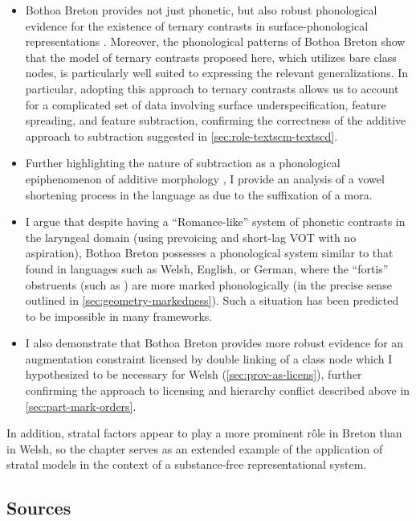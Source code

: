 \begin{itemize}
\item Bothoa Breton provides not just phonetic, but also robust phonological evidence for the existence of ternary contrasts in surface\hyp phonological representations \citep[\cfm][]{kim02:_phonol,strycharczuk12:_phonet}. Moreover, the phonological patterns of Bothoa Breton show that the model of ternary contrasts proposed here, which utilizes bare class nodes, is particularly well suited to expressing the relevant generalizations. In particular, adopting this approach to ternary contrasts allows us to account for a complicated set of data involving surface underspecification, feature spreading, and feature subtraction, confirming the correctness of the additive approach to subtraction suggested in \cref{sec:role-textscm-textscd}.
\item Further highlighting the nature of subtraction as a phonological epiphenomenon of additive morphology \citep{bye09:_exten_expon_and_non_concat_morph}, I provide an analysis of a vowel shortening process in the language as due to the suffixation of a mora.
\item I argue that despite having a \enquote{Romance\hyp like} system of phonetic contrasts in the laryngeal domain (\ie using prevoicing and short\hyp lag VOT with no aspiration), Bothoa Breton possesses a phonological system similar to that found in languages such as Welsh, English, or German, where the \enquote{fortis} obstruents (such as \ipa{[p~t~k]}) are more marked phonologically (in the precise sense outlined in \cref{sec:geometry-markedness}). Such a situation has been predicted to be impossible in many frameworks.
\item I also demonstrate that Bothoa Breton provides more robust evidence for an augmentation constraint licensed by double linking of a class node which I hypothesized to be necessary for Welsh (\cref{sec:prov-as-licens}), further confirming the approach to licensing and hierarchy conflict described above in \cref{sec:part-mark-orders}.
\end{itemize}

In addition, stratal factors appear to play a more prominent rôle in Breton than in Welsh, so the chapter serves as an extended example of the application of stratal models in the context of a substance\hyp free representational system.

\subsection{Sources}
\label{sec:sources-2}


